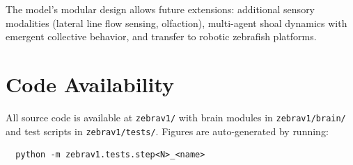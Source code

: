 \documentclass[11pt,a4paper]{article}
\begin{document}
The model's modular design allows future extensions: additional sensory
modalities (lateral line flow sensing, olfaction), multi-agent shoal
dynamics with emergent collective behavior, and transfer to robotic
zebrafish platforms.

\section{Code Availability}

All source code is available at \texttt{zebrav1/} with brain modules in
\texttt{zebrav1/brain/} and test scripts in \texttt{zebrav1/tests/}.
Figures are auto-generated by running:
\begin{verbatim}
  python -m zebrav1.tests.step<N>_<name>
\end{verbatim}
\end{document}
